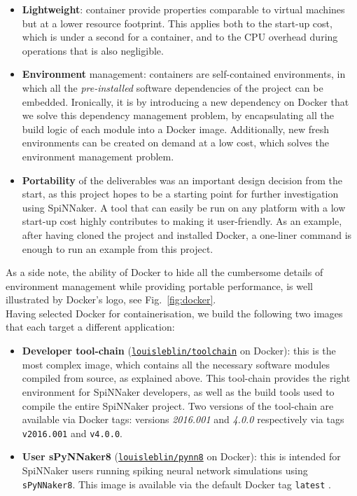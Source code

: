 \begin{itemize}
\item \textbf{Lightweight}: container provide properties comparable to virtual machines but at a lower resource footprint. This applies both to the start-up cost, which is under a second for a container, and to the CPU overhead during operations that is also negligible.

\item \textbf{Environment} management: containers are self-contained environments, in which all the \textit{pre-installed} software dependencies of the project can be embedded. Ironically, it is by introducing a new dependency on Docker that we solve this dependency management problem, by encapsulating all the build logic of each module into a Docker image. Additionally, new fresh environments can be created on demand at a low cost, which solves the environment management problem.

\item \textbf{Portability} of the deliverables was an important design decision from the start, as this project hopes to be a starting point for further investigation using SpiNNaker. A tool that can easily be run on any platform with a low start-up cost highly contributes to making it user-friendly. As an example, after having cloned the project and installed Docker, a one-liner command is enough to run an example from this project.
\end{itemize}

As a side note, the ability of Docker to hide all the cumbersome details of environment management while providing portable performance, is well illustrated by Docker's logo, see Fig.~\ref{fig:docker}. \\

Having selected Docker for containerisation, we build the following two images that each target a different application:

\begin{itemize}
\item \textbf{Developer tool-chain} (\href{https://hub.docker.com/r/louisleblin/toolchain/}{\texttt{louisleblin/toolchain}} on Docker): this is the most complex image, which contains all the necessary software modules compiled from source, as explained above. This tool-chain provides the right environment for SpiNNaker developers, as well as the build tools used to compile the entire SpiNNaker project. Two versions of the tool-chain are available via Docker tags: versions \textit{2016.001} and \textit{4.0.0} respectively via tags \texttt{v2016.001} and \texttt{v4.0.0}.

\item \textbf{User sPyNNaker8}  (\href{https://hub.docker.com/r/louisleblin/pynn8/}{\texttt{louisleblin/pynn8}} on Docker): this is intended for SpiNNaker users running spiking neural network simulations using \texttt{sPyNNaker8}. This image is available via the default Docker tag \texttt{latest} .
\end{itemize}

